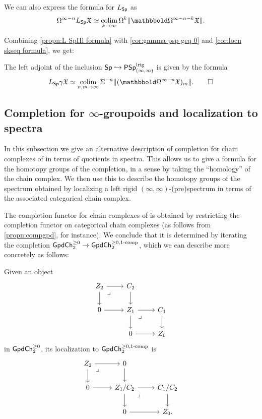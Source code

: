 \documentclass[a4paper,11pt]{article}
\begin{document}
\begin{observation}
  We can also express the formula for $L_{\textup{\textsf{Sp}}}$ as
  \[ \Omega^{\infty-n}L_{\Sp}\spX \simeq \colimP_{k \rightarrow
      \infty} \Omega^{k}\| \mOm^{\infty-n-k} \spX\|. \]
\end{observation}

Combining \cref{propn:L SpIIl formula} with \cref{cor:gamma psp geq 0}
and \cref{cor:locn skseq formula}, we get:
\begin{cornoproof}
  The left adjoint of the inclusion $\textup{\textsf{Sp}} \hookrightarrow \textup{\textsf{PSp}}_{(\infty,\infty)}^{\text{\textup{lrig}}}$ is
  given by the formula
  \[ L_{\Sp} \gamma \spX \simeq \colimP_{n,m \rightarrow \infty}
    \Sigma^{-n}\|(\mOm^{\infty-n}\spX)_{m}\|. \qedhere\]
\end{cornoproof}


\subsection{Completion for $\infty$-groupoids and localization to
  spectra}
\label{sec:comp igpd}

In this subsection we give an alternative description of completion
for chain complexes of \igpds{} in terms of quotients in spectra. This
allows us to give a formula for the homotopy groups of the completion,
in a sense by taking the ``homology'' of the chain complex. We then
use this to describe the homotopy groups of the spectrum obtained by
localizing a left rigid $(\infty,\infty)$-(pre)spectrum in terms of
the associated categorical chain complex.

The completion functor for chain complexes of \igpds{} is obtained by
restricting the completion functor on categorical chain complexes (as
follows from \cref{propn:compgpd}, for instance). We conclude that it is
determined by iterating the completion $\GpdChp_{2} \to
\GpdChpcgr{1}_{2}$, which we can describe more concretely as follows:
\begin{propn}\label{propn:gpdchcomp}
  Given an object
  \begin{equation}
    \label{eq:len 2 ch cx gpd}
    \begin{tikzcd}
      Z_{2} \ar[r] \ar[d] \drpullback & C_{2} \ar[d] \\
      0 \ar[r] & Z_{1} \ar[d] \ar[r]\drpullback  & C_{1} \ar[d] \\
      &  0 \ar[r] & Z_{0}
    \end{tikzcd}
  \end{equation}
  in $\textup{\textsf{GpdCh}}^{\geq 0}_{2}$, its localization to $\textup{\textsf{GpdCh}}^{\geq 0,1\text{\textup{-comp}}}_{2}$ is
  \begin{equation}
    \label{eq:gpdcompch}
    \begin{tikzcd}
      Z_{2} \ar[r] \ar[d] \drpullback & 0 \ar[d] \\
      0 \ar[r] & Z_{1}/C_{2} \ar[d] \ar[r]\drpullback  & C_{1}/C_{2} \ar[d] \\
      &  0 \ar[r] & Z_{0}.
    \end{tikzcd}
  \end{equation}
\end{propn}
\end{document}
